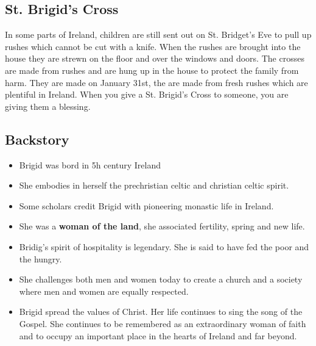 \documentclass[a4paper]{article}
\begin{document}
\subsection{St. Brigid's Cross}

In some parts of Ireland, children are still sent out on St. Bridget's Eve to pull up rushes which cannot be cut with a knife.
When the rushes are brought into the house they are strewn on the floor and over the windows and doors.
The crosses are made from rushes and are hung up in the house to protect the family from harm. They are made on January 31st, the are made from fresh rushes which are plentiful in Ireland.
When you give a St. Brigid's Cross to someone, you are giving them a blessing.

\subsection{Backstory}



\begin{itemize}
    \item Brigid was bord in 5h century Ireland
    \item She embodies in herself the prechristian celtic and christian celtic spirit. 
    \item Some scholars credit Brigid with pioneering monastic life in Ireland. 
    \item She was a \textbf{woman of the land}, she associated fertility, spring and new life.
    \item Bridig's spirit of hospitality is legendary. She is said to have fed the poor and the hungry.
    \item She challenges both men and women today to create a church and a society where men and women are equally respected.
    \item Brigid spread the values of Christ. Her life continues to sing the song of the Gospel. She continues to be remembered as an extraordinary woman of faith and to occupy an important place in the hearts of Ireland and far beyond.
\end{itemize}
\end{document}

